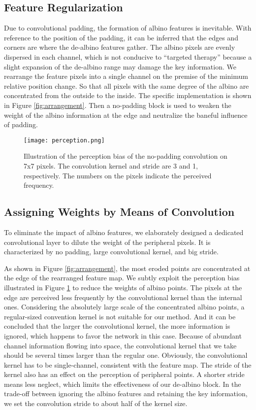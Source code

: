 \documentclass[10pt,twocolumn,letterpaper]{article}
\begin{document}
\subsection{Feature Regularization}\label{section:arrangement}
	Due to convolutional padding, the formation of albino features is inevitable. With reference to the position of the padding, it can be inferred that the edges and corners are where the de-albino features gather. The albino pixels are evenly dispersed in each channel, which is not conducive to “targeted therapy” because a slight expansion of the de-albino range may damage the key information. We rearrange the feature pixels into a single channel on the premise of the minimum relative position change. So that all pixels with the same degree of the albino are concentrated from the outside to the inside. The specific implementation is shown in Figure \ref{fig:arrangement}. Then a no-padding block is used to weaken the weight of the albino information at the edge and neutralize the baneful influence of padding.
\begin{figure}
\begin{center}
\texttt{[image: perception.png]}
\end{center}
   \caption{Illustration of the perception bias of the no-padding convolution on 7x7 pixels. The convolution kernel and stride are 3 and 1, respectively. The numbers on the pixels indicate the perceived frequency.}
\label{fig:perception}
\end{figure}


\subsection{Assigning Weights by Means of Convolution}
To eliminate the impact of albino features, we elaborately designed a dedicated convolutional layer to dilute the weight of the peripheral pixels. It is characterized by no padding, large convolutional kernel, and big stride.

As shown in Figure \ref{fig:arrangement}, the most eroded points are concentrated at the edge of the rearranged feature map. We subtly exploit the perception bias illustrated in Figure \ref{fig:perception} to reduce the weights of albino points. The pixels at the edge are perceived less frequently by the convolutional kernel than the internal ones. Considering the absolutely large scale of the concentrated albino points, a regular-sized convention kernel is not suitable for our method. And it can be concluded that the larger the convolutional kernel, the more information is ignored, which happens to favor the network in this case. Because of abundant channel information flowing into space, the convolutional kernel that we take should be several times larger than the regular one. Obviously, the convolutional kernel has to be single-channel, consistent with the feature map. The stride of the kernel also has an effect on the perception of peripheral points. A shorter stride means less neglect, which limits the effectiveness of our de-albino block. In the trade-off between ignoring the albino features and retaining the key information, we set the convolution stride to about half of the kernel size.
\end{document}
